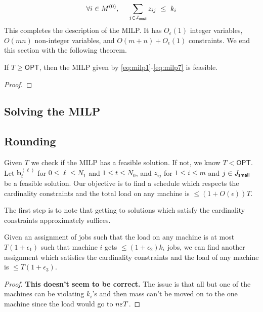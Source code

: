 \documentclass{article}[11pt]
\def\opt{\mathsf{OPT}}
\def\pv{\mathbf{b}}
\begin{document}
\begin{equation}\label{eq:milp7}
\forall i\in M^{(0)}, ~~~~ \sum_{j\in J_{\mathsf{small}}} z_{ij} ~\leq~ k_i
\end{equation}
This completes the description of the MILP. It has $O_\epsilon(1)$ integer variables, $O(mn)$ non-integer variables, and $O(m+n) + O_\epsilon(1)$ constraints.
We end this section with the following theorem.
\begin{theorem}\label{thm:p1}
If $T \geq \opt$, then the MILP given by \eqref{eq:milp1}-\eqref{eq:milp7} is feasible.
\end{theorem}
\begin{proof}
\end{proof}
\subsection{Solving the MILP}

\subsection{Rounding}
Given $T$ we check if the MILP has a feasible solution. If not, we know $T < \opt$. 
Let $\pv^{(\ell)}_t$ for $0\leq\ell\leq N_1$ and $1\leq t\leq N_0$, and $z_{ij}$ for $1\leq i\leq m$ and $j\in J_{\mathsf{small}}$ be a feasible solution. Our objective is to find a schedule which respects the cardinality constraints
	and the total load on any machine is $\leq (1+O(\epsilon))T$.
	
The first step is to note that getting to solutions which satisfy the cardinality constraints approximately suffices.
\begin{lemma}
	Given an assignment of jobs such that the load on any machine is at most $T(1+\epsilon_1)$ such that machine $i$ gets $\leq (1+\epsilon_2)k_i$ jobs, 
	we can find another assignment which satisfies the cardinality constraints and the load of any machine is $\leq T(1+\epsilon_3)$. 
\end{lemma}
\begin{proof}
	{\bf This doesn't seem to be correct.}
	The issue is that all but one of the machines can be violating $k_i$'s and then mass can't be moved on to the one machine since the load would go to $n\varepsilon T$.
\end{proof}
\end{document}
